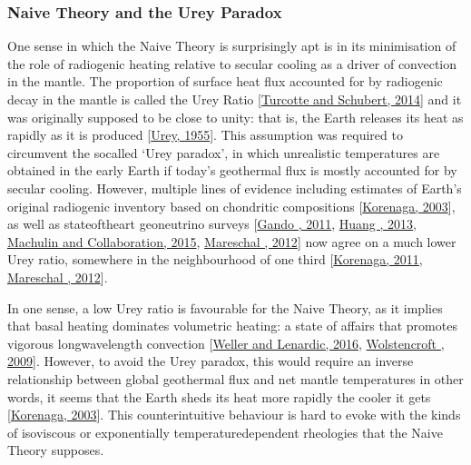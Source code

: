 \documentclass[letterpaper,10pt,english]{jupyterBook}
\begin{document}
\subsubsection{Naive Theory and the Urey Paradox}
\label{\detokenize{content/chapter_01_background/main:naive-theory-and-the-urey-paradox}}
\sphinxAtStartPar
One sense in which the Naive Theory is surprisingly apt is in its minimisation of the role of radiogenic heating relative to secular cooling as a driver of convection in the mantle. The proportion of surface heat flux accounted for by radiogenic decay in the mantle is called the Urey Ratio {[}\hyperlink{cite.references:id664}{Turcotte and Schubert, 2014}{]} and it was originally supposed to be close to unity: that is, the Earth releases its heat as rapidly as it is produced {[}\hyperlink{cite.references:id367}{Urey, 1955}{]}. This assumption was required to circumvent the so\sphinxhyphen{}called ‘Urey paradox’, in which unrealistic temperatures are obtained in the early Earth if today’s geothermal flux is mostly accounted for by secular cooling. However, multiple lines of evidence \sphinxhyphen{} including estimates of Earth’s original radiogenic inventory based on chondritic compositions {[}\hyperlink{cite.references:id306}{Korenaga, 2003}{]}, as well as state\sphinxhyphen{}of\sphinxhyphen{}the\sphinxhyphen{}art geoneutrino surveys {[}\hyperlink{cite.references:id522}{Gando , 2011}, \hyperlink{cite.references:id377}{Huang , 2013}, \hyperlink{cite.references:id14}{Machulin and Collaboration, 2015}, \hyperlink{cite.references:id365}{Mareschal , 2012}{]} \sphinxhyphen{} now agree on a much lower Urey ratio, somewhere in the neighbourhood of one third {[}\hyperlink{cite.references:id364}{Korenaga, 2011}, \hyperlink{cite.references:id365}{Mareschal , 2012}{]}.

\sphinxAtStartPar
In one sense, a low Urey ratio is favourable for the Naive Theory, as it implies that basal heating dominates volumetric heating: a state of affairs that promotes vigorous long\sphinxhyphen{}wavelength convection {[}\hyperlink{cite.references:id915}{Weller and Lenardic, 2016}, \hyperlink{cite.references:id8}{Wolstencroft , 2009}{]}. However, to avoid the Urey paradox, this would require an inverse relationship between global geothermal flux and net mantle temperatures \sphinxhyphen{} in other words, it seems that the Earth sheds its heat more rapidly the cooler it gets {[}\hyperlink{cite.references:id306}{Korenaga, 2003}{]}. This counter\sphinxhyphen{}intuitive behaviour is hard to evoke with the kinds of isoviscous or exponentially temperature\sphinxhyphen{}dependent rheologies that the Naive Theory supposes.
\end{document}
